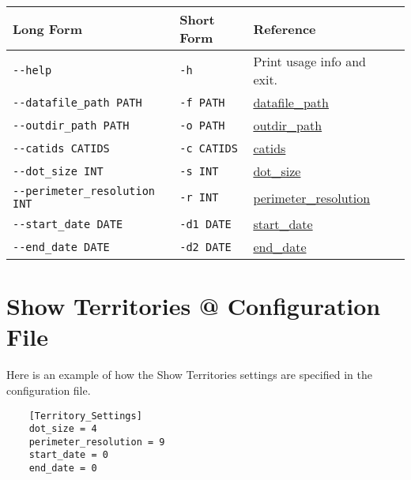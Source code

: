 \begin{table}[h]
\begin{tabular}{|l|l|l|l|}
  \hline
  Long Form & Short Form & Reference \\ \hline \hline

  \verb=--help= & \verb=-h= & Print usage info and exit. \\ \hline
  \verb=--datafile_path PATH= & \verb=-f PATH= & \hyperlink{global-datafile-path}{datafile\_path} \\ \hline
  \verb=--outdir_path PATH= & \verb=-o PATH= & \hyperlink{global-outdir-path}{outdir\_path} \\ \hline
  \verb=--catids CATIDS= & \verb=-c CATIDS= & \hyperlink{territory-catids}{catids} \\ \hline
  \verb=--dot_size INT= & \verb=-s INT= & \hyperlink{territory-dot-size}{dot\_size} \\ \hline
  \verb=--perimeter_resolution INT= & \verb=-r INT= & \hyperlink{territory-perimeter-resolution}{perimeter\_resolution} \\ \hline
  \verb=--start_date DATE= & \verb=-d1 DATE= & \hyperlink{territory-start-date}{start\_date} \\ \hline
  \verb=--end_date DATE= & \verb=-d2 DATE= & \hyperlink{territory-end-date}{end\_date} \\ \hline

\end{tabular}
\end{table}

\FloatBarrier


\section{Show Territories @ Configuration File}

Here is an example of how the Show Territories settings are specified
in the configuration file.

\begin{verbatim}
    [Territory_Settings]
    dot_size = 4
    perimeter_resolution = 9
    start_date = 0
    end_date = 0
\end{verbatim}

